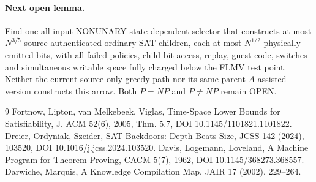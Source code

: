 \documentclass[11pt]{article}
\begin{document}
\paragraph{Next open lemma.} Find one all-input NONUNARY state-dependent selector that constructs at most $N^{3/5}$ source-authenticated ordinary SAT children, each at most $N^{1/2}$ physically emitted bits, with all failed policies, child bit access, replay, guest code, switches and simultaneous writable space fully charged below the FLMV test point. Neither the current source-only greedy path nor its same-parent $A$-assisted version constructs this arrow. Both $P=NP$ and $P\ne NP$ remain OPEN.

\begin{thebibliography}{9}
 Fortnow, Lipton, van Melkebeek, Viglas, Time-Space Lower Bounds for Satisfiability, J. ACM 52(6), 2005, Thm. 5.7, DOI 10.1145/1101821.1101822.
 Dreier, Ordyniak, Szeider, SAT Backdoors: Depth Beats Size, JCSS 142 (2024), 103520, DOI 10.1016/j.jcss.2024.103520.
 Davis, Logemann, Loveland, A Machine Program for Theorem-Proving, CACM 5(7), 1962, DOI 10.1145/368273.368557.
 Darwiche, Marquis, A Knowledge Compilation Map, JAIR 17 (2002), 229--264.
\end{thebibliography}
\end{document}
